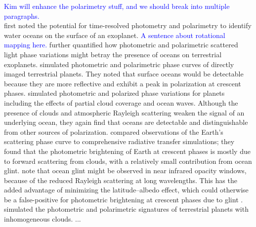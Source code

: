 \documentclass[
    usenatbib,
]{mnras}
\begin{document}
\textcolor{blue}{Kim will enhance the polarimetry stuff, and we should break into multiple paragraphs.}\\
\cite{2001Natur.412..885F} first noted the potential for time-resolved photometry and polarimetry to identify water oceans on the surface of an exoplanet. \textcolor{blue}{A sentence about rotational mapping here.} \cite{2006astro.ph.10518M} further quantified how photometric and polarimetric scattered light phase variations might betray the presence of oceans on terrestrial exoplanets.   
\cite{2008Icar..195..927W} simulated photometric and polarimetric phase curves of directly imaged terrestrial planets. They noted that surface oceans would be detectable because they are more reflective and exhibit a peak in polarization at crescent phases. \cite{Zugger_2010} simulated photometric and polarized phase variations for planets including the effects of partial cloud coverage and ocean waves. Although the presence of clouds and atmospheric Rayleigh scattering weaken the signal of an underlying ocean, they again find that oceans are detectable and distinguishable from other sources of polarization. \cite{2010ApJ...721L..67R} compared observations of the Earth's scattering phase curve to comprehensive radiative transfer simulations; they found that the photometric brightening of Earth at crescent phases is mostly due to forward scattering from clouds, with a relatively small contribution from ocean glint.
\citet{Zugger_2011} note that ocean glint might be observed in near infrared opacity windows, because of the reduced Rayleigh scattering at long wavelengths. This has the added advantage of minimizing the latitude--albedo effect, which could otherwise be a false-positive for photometric brightening at crescent phases due to glint \citep{2012ApJ...752L...3C}. \cite{2019A&A...626A.129T} simulated the photometric and polarimetric signatures of terrestrial planets with inhomogeneous clouds. \cite{2022A&A...664A.172T}...


\end{document}
